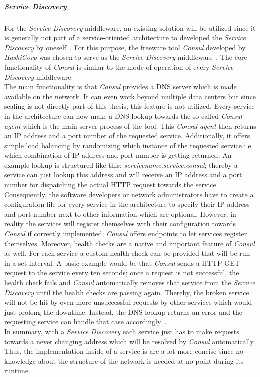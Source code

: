 \documentclass[12pt,a4paper]{report}
\begin{document}
\subparagraph{Service Discovery}
For the \textit{Service Discovery} middleware, an existing solution will be
utilized since it is generally not part of a service-oriented architecture
to developed the \textit{Service Discovery} by oneself~\cn.
For this purpose, the freeware tool \textit{Consul} developed by \textit{HashiCorp}
was chosen to serve as the \textit{Service Discovery} middleware~\cite{consul-docs}.
The core functionality of \textit{Consul} is similar to the mode of operation
of every \textit{Service Discovery} middleware.\\
The main functionality is that \textit{Consul} provides a DNS server which is
made available on the network. It can even work beyond multiple data centers
but since scaling is not directly part of this thesis, this feature is not utilized.
Every service in the architecture can now make a DNS lookup towards the so-called
\textit{Consul agent} which is the main server process of the tool.
This \textit{Consul agent} then returns an IP address and a
port number of the requested service. Additionally, it offers simple
load balancing by randomizing which instance of the requested service
i.e. which combination of IP address and port number is getting returned.
An example lookup is structured like this: \textit{servicename.service.consul};
thereby a service can just lookup this address and will receive an IP address
and a port number for dispatching the actual HTTP request towards the service.
Consequently, the software developers or network administrators have to
create a configuration file for every service in the architecture to specify
their IP address and port number next to other information which are optional.
However, in reality the services will register themselves with their configuration
towards \textit{Consul} if correctly implemented;
\textit{Consul} offers endpoints to let services register themselves.
Moreover, health checks are a native and important feature of \textit{Consul}
as well. For each service a custom health check can be provided that
will be run in a set interval. A basic example would be that \textit{Consul}
sends a HTTP GET request to the service every ten seconds;
once a request is not successful, the health check fails and \textit{Consul}
automatically removes that service from the \textit{Service Discovery}
until the health checks are passing again. Thereby, the broken service will
not be hit by even more unsuccessful requests by other services which would just
prolong the downtime. Instead, the DNS lookup returns an error and the
requesting service can handle that case accordingly~\cite{consul-docs}.\\
In summary, with a \textit{Service Discovery} each service just has to
make requests towards a never changing address which will be resolved by
\textit{Consul} automatically. Thus, the implementation inside of a service is
are a lot more concise since no knowledge about the structure of the network
is needed at no point during its runtime.
\end{document}
